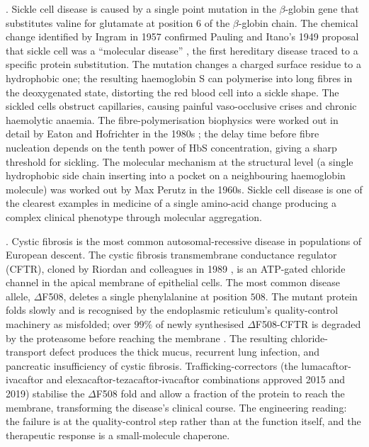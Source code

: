 . Sickle cell disease is caused by a
single point mutation in the $\beta$-globin gene that substitutes
valine for glutamate at position $6$ of the $\beta$-globin chain. The
chemical change identified by Ingram in 1957
\cite{paper:v6c04-ingram-1957} confirmed Pauling and Itano's 1949
proposal that sickle cell was a ``molecular disease''
\cite{paper:v6c04-pauling-itano-1949}, the first hereditary disease
traced to a specific protein substitution. The mutation changes a
charged surface residue to a hydrophobic one; the resulting
haemoglobin S can polymerise into long fibres in the deoxygenated
state, distorting the red blood cell into a sickle shape. The
sickled cells obstruct capillaries, causing painful vaso-occlusive
crises and chronic haemolytic anaemia. The fibre-polymerisation
biophysics were worked out in detail by Eaton and Hofrichter in the
1980s \cite{paper:v6c04-eaton-hofrichter-1990}; the delay time
before fibre nucleation depends on the tenth power of HbS
concentration, giving a sharp threshold for sickling. The molecular
mechanism at the structural level (a single hydrophobic side chain
inserting into a pocket on a neighbouring haemoglobin molecule) was
worked out by Max Perutz in the 1960s. Sickle cell disease is one
of the clearest examples in medicine of a single amino-acid change
producing a complex clinical phenotype through molecular aggregation.

. Cystic
fibrosis is the most common autosomal-recessive disease in
populations of European descent. The cystic fibrosis transmembrane
conductance regulator (CFTR), cloned by Riordan and colleagues in
1989 \cite{paper:v6c04-riordan-cftr-1989}, is an ATP-gated chloride
channel in the apical membrane of epithelial cells. The most common
disease allele, $\Delta$F508, deletes a single phenylalanine at
position $508$. The mutant protein folds slowly and is recognised
by the endoplasmic reticulum's quality-control machinery as
misfolded; over $99\%$ of newly synthesised $\Delta$F508-CFTR is
degraded by the proteasome before reaching the membrane
\cite{paper:v6c04-cheung-cftr-2006}. The resulting chloride-transport
defect produces the thick mucus, recurrent lung infection, and
pancreatic insufficiency of cystic fibrosis. Trafficking-correctors
(the lumacaftor-ivacaftor and elexacaftor-tezacaftor-ivacaftor
combinations approved 2015 and 2019) stabilise the $\Delta$F508
fold and allow a fraction of the protein to reach the membrane,
transforming the disease's clinical course. The engineering reading:
the failure is at the quality-control step rather than at the
function itself, and the therapeutic response is a small-molecule
chaperone.

